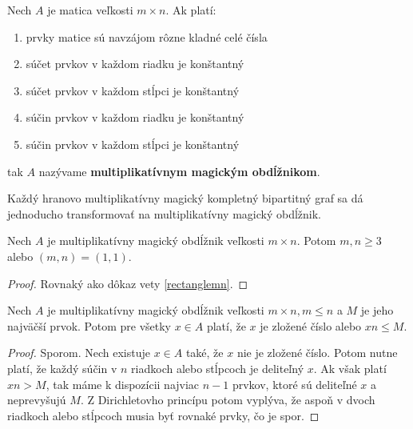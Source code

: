 \begin{subdefinition} Nech $A$ je matica veľkosti $m \times n$. Ak platí:

\begin{enumerate}
\item prvky matice sú navzájom rôzne kladné celé čísla
\item súčet prvkov v každom riadku je konštantný
\item súčet prvkov v každom stĺpci je konštantný
\item súčin prvkov v každom riadku je konštantný
\item súčin prvkov v každom stĺpci je konštantný
\end{enumerate}

tak $A$ nazývame \textbf{multiplikatívnym magickým obdĺžnikom}.
\end{subdefinition} 

Každý hranovo multiplikatívny magický kompletný bipartitný graf sa dá jednoducho transformovať na multiplikatívny magický obdĺžnik. \\

\begin{subtheorem} Nech $A$ je multiplikatívny magický obdĺžnik veľkosti $m \times n$. Potom $m,n \geq 3$ alebo $(m, n) = (1, 1)$.
\end{subtheorem}

\begin{proof} Rovnaký ako dôkaz vety \ref{rectanglemn}.
\end{proof}

\begin{subtheorem}
\label{rectanglemax}
Nech $A$ je multiplikatívny magický obdĺžnik veľkosti $m \times n, m \leq n$ a $M$ je jeho najväčší prvok. Potom pre všetky $x \in A$ platí, že $x$ je zložené číslo alebo $xn \leq M$.
\end{subtheorem}

\begin{proof} Sporom. Nech existuje $x \in A$ také, že $x$ nie je zložené číslo. Potom nutne platí, že každý súčin v $n$ riadkoch alebo stĺpcoch je deliteľný $x$. Ak však platí $xn > M$, tak máme k dispozícii najviac $n-1$ prvkov, ktoré sú deliteľné $x$ a neprevyšujú $M$. Z Dirichletovho princípu potom vyplýva, že aspoň v dvoch riadkoch alebo stĺpcoch musia byť rovnaké prvky, čo je spor.
\end{proof}


